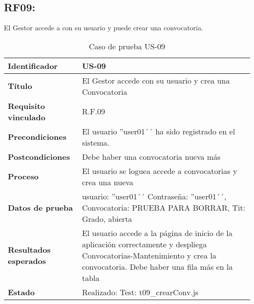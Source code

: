 \subsection{RF09:} El Gestor accede a con su usuario y puede crear una convocatoria.
\begin{table}[H]
	\centering
	\renewcommand{\arraystretch}{1.3} 
	\begin{tabularx}{\textwidth}{|l|X|}
		\hline
		\textbf{Identificador} & US-09 \\
		\hline
		\textbf{Título} & El Gestor accede con su usuario y crea una Convocatoria \\
		\hline
		\textbf{Requisito vinculado} & R.F.09 \\
		\hline
		\textbf{Precondiciones} & El usuario ''user01´´ ha sido registrado en el sistema.\\
		\hline
		\textbf{Postcondiciones} & Debe haber una convocatoria nueva más \\
		\hline
		\textbf{Proceso} & El usuario se loguea accede a convocatorias y crea una nueva \\
		\hline
		\textbf{Datos de prueba} & usuario: ''user01´´ Contraseña: ''user01´´, Convocatoria: PRUEBA PARA BORRAR, Tit: Grado, abierta  \\
		\hline
		\textbf{Resultados esperados} & El usuario accede a la página de inicio de la aplicación correctamente y despliega Convocatorias-Mantenimiento y crea la convocatoria. Debe haber una fila más en la tabla \\
		\hline
		\textbf{Estado} & Realizado: Test: t09\_crearConv.js\\
		\hline
	\end{tabularx}
	\caption{Caso de prueba US-09}
	\label{tab:caso_us09}
\end{table}

